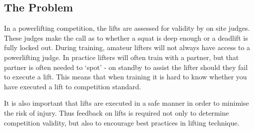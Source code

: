 \subsection{The Problem}

In a powerlifting competition, the lifts are assessed for validity by on site judges. These judges make the call as to whether a squat is deep enough or a deadlift is fully locked out. During training, amateur lifters will not always have access to a powerlifting judge. In practice lifters will often train with a partner, but that partner is often needed to ‘spot’ - on standby to assist the lifter should they fail to execute a lift. This means that when training it is hard to know whether you have executed a lift to competition standard.

It is also important that lifts are executed in a safe manner in order to minimise the risk of injury. Thus feedback on lifts is required not only to determine competition validity, but also to encourage best practices in lifting technique.